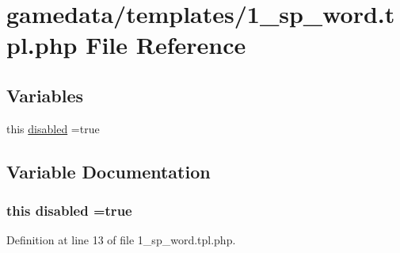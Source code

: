 \hypertarget{1__sp__word_8tpl_8php}{\section{gamedata/templates/1\+\_\+sp\+\_\+word.tpl.\+php File Reference}
\label{1__sp__word_8tpl_8php}
}
\subsection*{Variables}
\begin{DoxyCompactItemize}
\item 
this \hyperlink{1__sp__word_8tpl_8php_a5954796dd8b0e54067ec29be2f8c5cf3}{disabled} =true
\end{DoxyCompactItemize}


\subsection{Variable Documentation}
\hypertarget{1__sp__word_8tpl_8php_a5954796dd8b0e54067ec29be2f8c5cf3}{
\subsubsection[{disabled}]{\setlength{\rightskip}{0pt plus 5cm}this disabled =true}}\label{1__sp__word_8tpl_8php_a5954796dd8b0e54067ec29be2f8c5cf3}


Definition at line 13 of file 1\+\_\+sp\+\_\+word.\+tpl.\+php.


